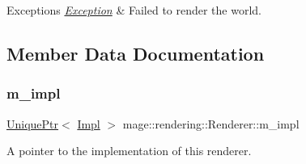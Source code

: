 \begin{DoxyExceptions}{Exceptions}
{\em \hyperlink{classmage_1_1_exception}{Exception}} & Failed to render the world. \\
\hline
\end{DoxyExceptions}


\subsection{Member Data Documentation}
\hypertarget{classmage_1_1rendering_1_1_renderer_aee44d4c9014216d84030ecfc6e64b1e4}{}\label{classmage_1_1rendering_1_1_renderer_aee44d4c9014216d84030ecfc6e64b1e4} 
\subsubsection{\texorpdfstring{m\+\_\+impl}{m\_impl}}
{\footnotesize\ttfamily \hyperlink{namespacemage_a3316d7143a973e37adf1110f2e80ca31}{Unique\+Ptr}$<$ \hyperlink{classmage_1_1rendering_1_1_renderer_1_1_impl}{Impl} $>$ mage\+::rendering\+::\+Renderer\+::m\+\_\+impl\hspace{0.3cm}{\ttfamily [private]}}

A pointer to the implementation of this renderer. 